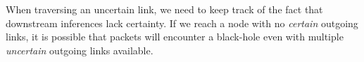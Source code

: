 When traversing an uncertain link, we need to keep track of the fact that downstream inferences lack certainty.
If we reach a node with no \emph{certain} outgoing links,
it is possible that packets will encounter a black-hole even with multiple \emph{uncertain} outgoing links available.


